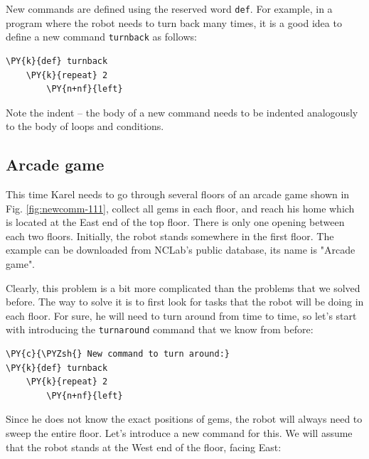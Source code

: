 New commands are defined using the reserved word 
{\tt def}. For example, in a program where the robot needs to turn back
many times, it is a good idea to define a new command {\tt turnback}
as follows:\\

\begin{bbox}
\begin{Verbatim}[commandchars=\\\{\}]
\PY{k}{def} turnback
    \PY{k}{repeat} 2
        \PY{n+nf}{left}
\end{Verbatim}
\end{bbox}
\vspace{6mm}

\noindent
Note the indent -- the body of a new command needs to be indented 
analogously to the body of loops and conditions.

\subsection{Arcade game}

This time Karel needs to go through several floors of an arcade game
shown in Fig. \ref{fig:newcomm-111}, collect all gems in each floor, 
and reach his home which is located at the East end of the top floor. 
There is only one opening between each two floors. Initially, 
the robot stands somewhere in the first floor.
The example can be downloaded from NCLab's public database, its 
name is "Arcade game".

Clearly, this problem is a bit more complicated than the problems that we 
solved before. The way to solve it is to first 
look for tasks that the robot will be doing in each floor. For sure, he will
need to turn around from time to time, so let's start with introducing 
the {\tt turnaround} command that we know from before:\\

\begin{bbox}
\begin{Verbatim}[commandchars=\\\{\}]
\PY{c}{\PYZsh{} New command to turn around:}
\PY{k}{def} turnback
    \PY{k}{repeat} 2
        \PY{n+nf}{left}
\end{Verbatim}
\end{bbox}
\vspace{6mm}

\noindent
Since he does not know 
the exact positions of gems, the robot will always need to sweep the entire 
floor. Let's introduce a new command for this. We will assume that the 
robot stands at the West end of the floor, facing East:

